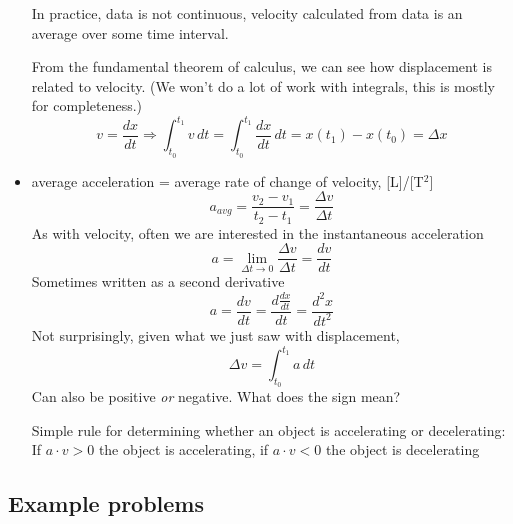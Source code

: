 \begin{itemize}
In practice, data is not continuous, velocity calculated from data is an average over some time interval.

From the fundamental theorem of calculus, we can see how displacement is related to velocity. (We won't do a lot of work with integrals, this is mostly for completeness.)
$$v=\frac{dx}{dt}\Rightarrow \boxed{\int_{t_0}^{t_1}v\,dt = \int_{t_0}^{t_1}\frac{dx}{dt}\,dt=x(t_1)-x(t_0)=\Delta{x}}$$


\item average acceleration = average rate of change of velocity, [L]/[T$^2$]
$$a_{avg}=\frac{v_2-v_1}{t_2-t_1}=\frac{\Delta{v}}{\Delta{t}}$$
As with velocity, often we are interested in the instantaneous acceleration
$$a=\lim_{\Delta{t}\rightarrow 0}\frac{\Delta{v}}{\Delta{t}}=\frac{dv}{dt}$$
Sometimes written as a second derivative
$$a=\frac{dv}{dt}=\frac{d\frac{dx}{dt}}{dt}=\frac{d^2x}{dt^2}$$
Not surprisingly, given what we just saw with displacement,
$$\Delta{v}=\int_{t_0}^{t_1}a\,dt$$
Can also be positive \textit{or} negative. What does the sign mean?

Simple rule for determining whether an object is accelerating or decelerating:\\
If $a\cdot v>0$ the object is accelerating, if $a\cdot v<0$ the object is decelerating  
\end{itemize}

\subsection{Example problems}


